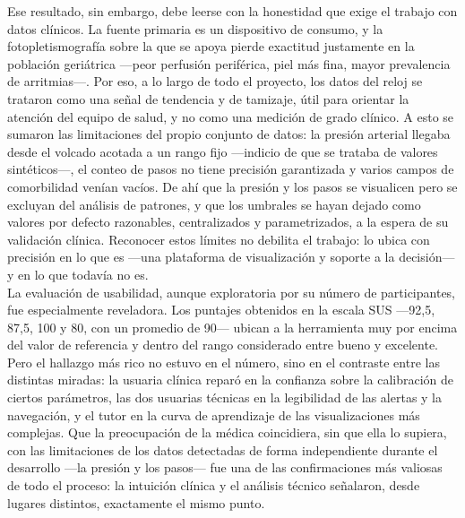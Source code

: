 Ese resultado, sin embargo, debe leerse con la honestidad que exige el trabajo con datos clínicos. La fuente primaria es un dispositivo de consumo, y la fotopletismografía sobre la que se apoya pierde exactitud justamente en la población geriátrica —peor perfusión periférica, piel más fina, mayor prevalencia de arritmias—. Por eso, a lo largo de todo el proyecto, los datos del reloj se trataron como una señal de tendencia y de tamizaje, útil para orientar la atención del equipo de salud, y no como una medición de grado clínico. A esto se sumaron las limitaciones del propio conjunto de datos: la presión arterial llegaba desde el volcado acotada a un rango fijo —indicio de que se trataba de valores sintéticos—, el conteo de pasos no tiene precisión garantizada y varios campos de comorbilidad venían vacíos. De ahí que la presión y los pasos se visualicen pero se excluyan del análisis de patrones, y que los umbrales se hayan dejado como valores por defecto razonables, centralizados y parametrizados, a la espera de su validación clínica. Reconocer estos límites no debilita el trabajo: lo ubica con precisión en lo que es —una plataforma de visualización y soporte a la decisión— y en lo que todavía no es.\\

La evaluación de usabilidad, aunque exploratoria por su número de participantes, fue especialmente reveladora. Los puntajes obtenidos en la escala SUS —92,5, 87,5, 100 y 80, con un promedio de 90— ubican a la herramienta muy por encima del valor de referencia y dentro del rango considerado entre bueno y excelente. Pero el hallazgo más rico no estuvo en el número, sino en el contraste entre las distintas miradas: la usuaria clínica reparó en la confianza sobre la calibración de ciertos parámetros, las dos usuarias técnicas en la legibilidad de las alertas y la navegación, y el tutor en la curva de aprendizaje de las visualizaciones más complejas. Que la preocupación de la médica coincidiera, sin que ella lo supiera, con las limitaciones de los datos detectadas de forma independiente durante el desarrollo —la presión y los pasos— fue una de las confirmaciones más valiosas de todo el proceso: la intuición clínica y el análisis técnico señalaron, desde lugares distintos, exactamente el mismo punto.\\


